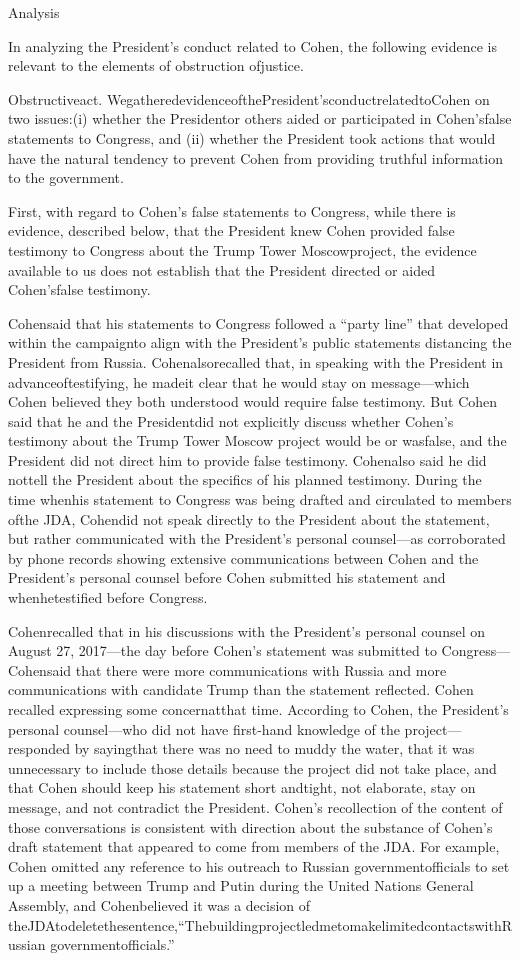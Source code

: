 {Analysis

In analyzing the President’s conduct related to Cohen, the following evidence is relevant to the elements of obstruction ofjustice.

Obstructiveact. WegatheredevidenceofthePresident’sconductrelatedtoCohen on two issues:(i) whether the Presidentor others aided or participated in Cohen’sfalse statements to Congress, and (ii) whether the President took actions that would have the natural tendency to prevent Cohen from providing truthful information to the government.

First, with regard to Cohen’s false statements to Congress, while there is evidence, described below, that the President knew Cohen provided false testimony to Congress about the Trump Tower Moscowproject, the evidence available to us does not establish that the President directed or aided Cohen’sfalse testimony.

Cohensaid that his statements to Congress followed a “party line” that developed within the campaignto align with the President’s public statements distancing the President from Russia. Cohenalsorecalled that, in speaking with the President in advanceoftestifying, he madeit clear that he would stay on message—which Cohen believed they both understood would require false testimony. But Cohen said that he and the Presidentdid not explicitly discuss whether Cohen’s testimony about the Trump Tower Moscow project would be or wasfalse, and the President did not direct him to provide false testimony. Cohenalso said he did nottell the President about the specifics of his planned testimony. During the time whenhis statement to Congress was being drafted and circulated to members ofthe JDA, Cohendid not speak directly to the President about the statement, but rather communicated with the President’s personal counsel—as corroborated by phone records showing extensive communications between Cohen and the President’s personal counsel before Cohen submitted his statement and whenhetestified before Congress.

Cohenrecalled that in his discussions with the President’s personal counsel on August 27, 2017—the day before Cohen’s statement was submitted to Congress—Cohensaid that there were more communications with Russia and more communications with candidate Trump than the statement reflected. Cohen recalled expressing some concernatthat time. According to Cohen, the President’s personal counsel—who did not have first-hand knowledge of the project— responded by sayingthat there was no need to muddy the water, that it was unnecessary to include those details because the project did not take place, and that Cohen should keep his statement short andtight, not elaborate, stay on message, and not contradict the President. Cohen’s recollection of the content of those conversations is consistent with direction about the substance of Cohen’s draft statement that appeared to come from members of the JDA. For example, Cohen omitted any reference to his outreach to Russian governmentofficials to set up a meeting between Trump and Putin during the United Nations General Assembly, and Cohenbelieved it was a decision of theJDAtodeletethesentence,“ThebuildingprojectledmetomakelimitedcontactswithRussian governmentofficials.”

}
